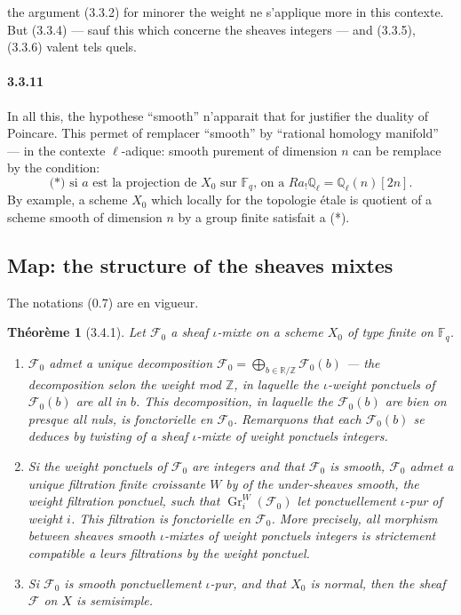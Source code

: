 \documentclass[12pt,a4paper]{article}
\theoremstyle{plain}
\newtheorem{theorem}{Th\'eor\`eme}[section]
\theoremstyle{definition}
\theoremstyle{remark}
\DeclareMathOperator{\Gr}{Gr}
\newcommand{\FF}{{\mathbb{F}}}
\newcommand{\QQ}{{\mathbb{Q}}}
\newcommand{\RR}{{\mathbb{R}}}
\newcommand{\ZZ}{{\mathbb{Z}}}
\begin{document}
the argument (3.3.2) for minorer the weight ne s'applique more in this contexte. But (3.3.4) --- sauf this which concerne the sheaves integers --- and (3.3.5), (3.3.6) valent tels quels.


\paragraph{3.3.11}
In all this, the hypothese ``smooth'' n'apparait that for justifier the duality of Poincare. This permet of remplacer ``smooth'' by ``rational homology manifold'' --- in the contexte $\ell$-adique: smooth purement of dimension $n$ can be remplace by the condition:
\begin{equation}\label{eq:3.3.11.1}
\text{(*) si $a$ est la projection de $X_0$ sur $\FF_q$, on a $Ra_! \QQ_\ell = \QQ_\ell(n)[2n]$.}
\end{equation}
By example, a scheme $X_0$ which locally for the topologie étale is quotient of a scheme smooth of dimension $n$ by a group finite satisfait a (*).


\subsection{Map: the structure of the sheaves mixtes}

The notations (0.7) are en vigueur.

\begin{theorem}[3.4.1]
Let $\mathscr{F}_0$ a sheaf $\iota$-mixte on a scheme $X_0$ of type finite on $\FF_q$.
\begin{enumerate}[label=(\roman*)]
\item $\mathscr{F}_0$ admet a unique decomposition $\mathscr{F}_0 = \bigoplus_{b \in \RR/\ZZ} \mathscr{F}_0(b)$ --- the decomposition selon the weight mod $\ZZ$, in laquelle the $\iota$-weight ponctuels of $\mathscr{F}_0(b)$ are all in $b$. This decomposition, in laquelle the $\mathscr{F}_0(b)$ are bien on presque all nuls, is fonctorielle en $\mathscr{F}_0$. Remarquons that each $\mathscr{F}_0(b)$ se deduces by twisting of a sheaf $\iota$-mixte of weight ponctuels integers.
\item Si the weight ponctuels of $\mathscr{F}_0$ are integers and that $\mathscr{F}_0$ is smooth, $\mathscr{F}_0$ admet a unique filtration finite croissante $W$ by of the under-sheaves smooth, the weight filtration ponctuel, such that $\Gr_i^W(\mathscr{F}_0)$ let ponctuellement $\iota$-pur of weight $i$. This filtration is fonctorielle en $\mathscr{F}_0$. More precisely, all morphism between sheaves smooth $\iota$-mixtes of weight ponctuels integers is strictement compatible a leurs filtrations by the weight ponctuel.
\item Si $\mathscr{F}_0$ is smooth ponctuellement $\iota$-pur, and that $X_0$ is normal, then the sheaf $\mathscr{F}$ on $X$ is semisimple.
\end{enumerate}
\end{theorem}
\end{document}

